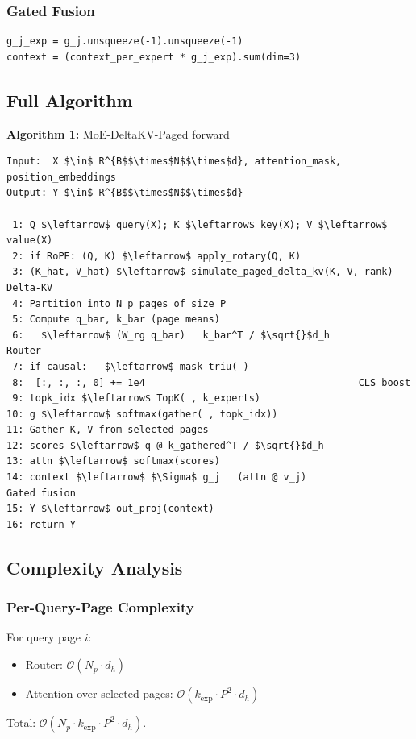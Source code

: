 \subsubsection{Gated Fusion}

\begin{lstlisting}
g_j_exp = g_j.unsqueeze(-1).unsqueeze(-1)
context = (context_per_expert * g_j_exp).sum(dim=3)
\end{lstlisting}

\subsection{Full Algorithm}

\textbf{Algorithm 1:} MoE-DeltaKV-Paged forward
\begin{lstlisting}
Input:  X $\in$ R^{B$$\times$N$$\times$d}, attention_mask, position_embeddings
Output: Y $\in$ R^{B$$\times$N$$\times$d}

 1: Q $\leftarrow$ query(X); K $\leftarrow$ key(X); V $\leftarrow$ value(X)
 2: if RoPE: (Q, K) $\leftarrow$ apply_rotary(Q, K)
 3: (K_hat, V_hat) $\leftarrow$ simulate_paged_delta_kv(K, V, rank)    Delta-KV
 4: Partition into N_p pages of size P
 5: Compute q_bar, k_bar (page means)
 6:   $\leftarrow$ (W_rg q_bar)   k_bar^T / $\sqrt{}$d_h                      Router
 7: if causal:   $\leftarrow$ mask_triu( )
 8:  [:, :, :, 0] += 1e4                                     CLS boost
 9: topk_idx $\leftarrow$ TopK( , k_experts)
10: g $\leftarrow$ softmax(gather( , topk_idx))
11: Gather K, V from selected pages
12: scores $\leftarrow$ q @ k_gathered^T / $\sqrt{}$d_h
13: attn $\leftarrow$ softmax(scores)
14: context $\leftarrow$ $\Sigma$ g_j   (attn @ v_j)                          Gated fusion
15: Y $\leftarrow$ out_proj(context)
16: return Y
\end{lstlisting}

\subsection{Complexity Analysis}

\subsubsection{Per-Query-Page Complexity}

For query page $i$:
\begin{itemize}
\item Router: $\mathcal{O}(N_p \cdot d_h)$
\item Attention over selected pages: $\mathcal{O}(k_\text{exp} \cdot P^2 \cdot d_h)$

\end{itemize}
Total: $\mathcal{O}(N_p \cdot k_\text{exp} \cdot P^2 \cdot d_h)$.

